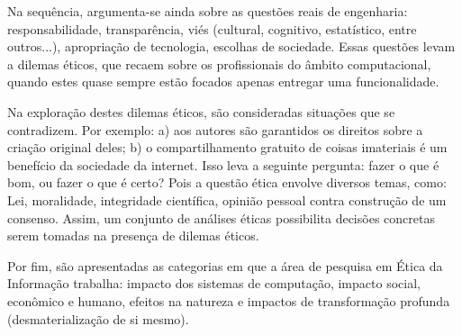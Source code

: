 Na sequência, argumenta-se ainda sobre as questões reais de engenharia: responsabilidade, transparência, viés (cultural, cognitivo, estatístico, entre outros...), apropriação de tecnologia, escolhas de sociedade. Essas questões levam a dilemas éticos, que recaem sobre os profissionais do âmbito computacional, quando estes quase sempre estão focados apenas entregar uma funcionalidade.

Na exploração destes dilemas éticos, são consideradas situações que se contradizem. Por exemplo: a) aos autores são garantidos os direitos sobre a criação original deles; b) o compartilhamento gratuito de coisas imateriais é um benefício da sociedade da internet. Isso leva a seguinte pergunta: fazer o que é bom, ou fazer o que é certo? Pois a questão ética envolve diversos temas, como: Lei, moralidade, integridade científica, opinião pessoal contra construção de um consenso. Assim, um conjunto de análises éticas possibilita decisões concretas serem tomadas na presença de dilemas éticos.

Por fim, são apresentadas as categorias em que a área de pesquisa em Ética da Informação trabalha: impacto dos sistemas de computação, impacto social, econômico e humano, efeitos na natureza e impactos de transformação profunda (desmaterialização de si mesmo).
